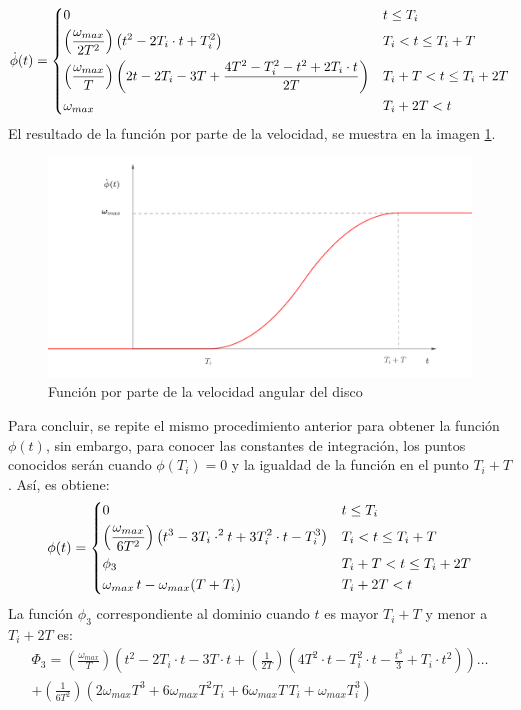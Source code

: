 \[ \dot{\phi}(t) =
\begin{dcases}
	0																												&	t \leq T_i \\
	\left(\frac{\omega_{max}}{2T^2}\right)\left(t^2 - 2T_i\cdot t + T_i^2\right)									&	T_i < t \leq T_i + T\\
	\left(\frac{\omega_{max}}{T}\right)\left(2t - 2T_i - 3T + \frac{4T^2 - T_i^2 - t^2 + 2T_i\cdot t}{2T}\right)	&	T_i + T < t \leq T_i + 2T\\
	\omega_{max}																									&	T_i + 2T < t\\
\end{dcases} 
\]
El resultado de la función por parte de la velocidad, se muestra en la imagen \ref{fig:anglep}.
\begin{figure}[h]
\centering
\includegraphics[scale=0.3,trim={5cm 0cm 4cm 0cm},clip]{Imagenes/anglep_function.pdf}
\caption{Función por parte de la velocidad angular del disco}
\label{fig:anglep}
\end{figure}

Para concluir, se repite el mismo procedimiento anterior para obtener la función $\phi (t)$, sin embargo, para conocer las constantes de integración, los puntos conocidos serán cuando $\phi(T_i) = 0$ y la igualdad de la función en el punto $T_i + T$. Así, es obtiene:
\[ \phi (t) =
\begin{dcases}
	0																									&	t \leq T_i \\
	\left(\frac{\omega_{max}}{6T^2}\right)\left(t^3 - 3T_i\cdot^2 t + 3T_i^2\cdot t - T_i^3\right)		&	T_i < t \leq T_i + T\\
	\phi_3																								&	T_i + T < t \leq T_i + 2T\\
	\omega_{max}\, t - \omega_{max}(T + T_i)															&	T_i + 2T < t\\
\end{dcases} 
\]
La función $\phi_3$ correspondiente al dominio cuando $t$ es mayor $T_i + T$ y menor a $T_i  + 2T$ es:
\begin{multline*}
\Phi_3 = \left(\frac{\omega_{max}}{T}\right)\left(t^2 - 2T_i\cdot t - 3T\cdot t + \left(\frac{1}{2T}\right)\left(4T^2\cdot t - T_i^2\cdot t - \frac{t^3}{3} + T_i\cdot t^2\right)\right)\dots \\
 + \left(\frac{1}{6T^2}\right) \left(2\omega_{max}T^3 + 6\omega_{max}T^2T_i + 6\omega_{max}T\,T_i + \omega_{max}T_i^3\right)
\end{multline*}

